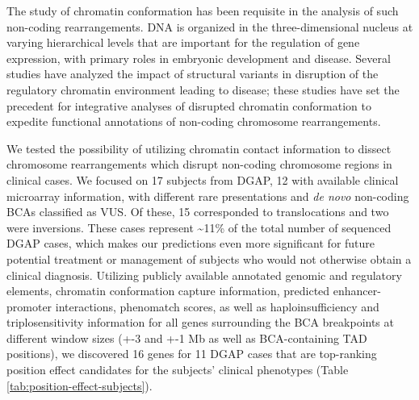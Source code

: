 \documentclass[a4paper,twoside=true,openright,parskip=full,chapterprefix=true,11pt,headings=normal,bibliography=totoc,listof=totoc,titlepage=on,captions=tableabove,draft=false]{scrreprt}
\theoremstyle{definition}
\theoremstyle{definition}
\theoremstyle{definition}
\theoremstyle{remark}
\begin{document}
The study of chromatin conformation has been requisite in the analysis
of such non-coding rearrangements. DNA is organized in the
three-dimensional nucleus at varying hierarchical levels that are
important for the regulation of gene expression,\citep{DeWit2012} with
primary roles in embryonic development and disease.\citep{Bonev2016}
Several studies have analyzed the impact of structural variants in
disruption of the regulatory chromatin environment leading to
disease;\citep{Lupianez2015, Groschel2014, Visser2012, Roussos2014, Giorgio2015, Ibn-Salem2014}
these studies have set the precedent for integrative analyses of
disrupted chromatin conformation to expedite functional annotations of
non-coding chromosome rearrangements.

We tested the possibility of utilizing chromatin contact information to
dissect chromosome rearrangements which disrupt non-coding chromosome
regions in clinical cases. We focused on 17 subjects from DGAP, 12 with
available clinical microarray information, with different rare
presentations and \emph{de novo} non-coding BCAs classified as VUS. Of
these, 15 corresponded to translocations and two were inversions. These
cases represent \textasciitilde{}11\% of the total number of sequenced
DGAP cases, which makes our predictions even more significant for future
potential treatment or management of subjects who would not otherwise
obtain a clinical diagnosis. Utilizing publicly available annotated
genomic and regulatory elements, chromatin conformation capture
information, predicted enhancer-promoter interactions, phenomatch
scores, as well as haploinsufficiency and triplosensitivity information
for all genes surrounding the BCA breakpoints at different window sizes
(+-3 and +-1 Mb as well as BCA-containing TAD positions), we discovered
16 genes for 11 DGAP cases that are top-ranking position effect
candidates for the subjects' clinical phenotypes (Table
\ref{tab:position-effect-subjects}).
\end{document}
